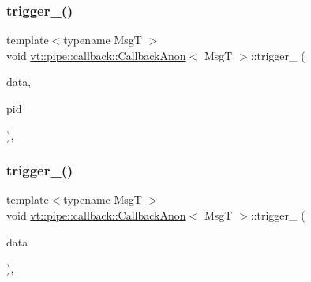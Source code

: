 \subsubsection{\texorpdfstring{trigger\+\_\+()}{trigger\_()}\hspace{0.1cm}{\footnotesize\ttfamily [1/2]}}
{\footnotesize\ttfamily template$<$typename MsgT $>$ \\
void \hyperlink{structvt_1_1pipe_1_1callback_1_1_callback_anon}{vt\+::pipe\+::callback\+::\+Callback\+Anon}$<$ MsgT $>$\+::trigger\+\_\+ (\begin{DoxyParamCaption}\item[{\hyperlink{structvt_1_1pipe_1_1callback_1_1_callback_anon_ac503b95feb44bb0b60c1d69e1ed29074}{Signal\+Data\+Type} $\ast$}]{data,  }\item[{\hyperlink{namespacevt_ac9852acda74d1896f48f406cd72c7bd3}{Pipe\+Type} const \&}]{pid }\end{DoxyParamCaption})\hspace{0.3cm}{\ttfamily [override]}, {\ttfamily [private]}}

\mbox{\label{structvt_1_1pipe_1_1callback_1_1_callback_anon_aa94691cc38d84194b66f5bbb30f43686}} 
\subsubsection{\texorpdfstring{trigger\+\_\+()}{trigger\_()}\hspace{0.1cm}{\footnotesize\ttfamily [2/2]}}
{\footnotesize\ttfamily template$<$typename MsgT $>$ \\
void \hyperlink{structvt_1_1pipe_1_1callback_1_1_callback_anon}{vt\+::pipe\+::callback\+::\+Callback\+Anon}$<$ MsgT $>$\+::trigger\+\_\+ (\begin{DoxyParamCaption}\item[{\hyperlink{structvt_1_1pipe_1_1callback_1_1_callback_anon_ac503b95feb44bb0b60c1d69e1ed29074}{Signal\+Data\+Type} $\ast$}]{data }\end{DoxyParamCaption})\hspace{0.3cm}{\ttfamily [override]}, {\ttfamily [private]}}

\mbox{\label{structvt_1_1pipe_1_1callback_1_1_callback_anon_adc36e958ce1416fda53159e441e31168}} 
